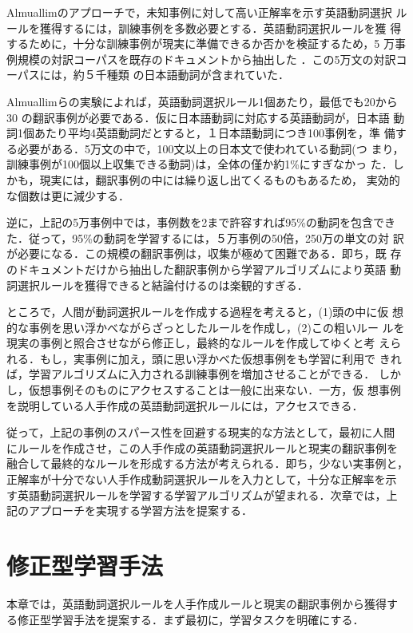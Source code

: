 Almuallimのアプローチで，未知事例に対して高い正解率を示す英語動詞選択
ルールを獲得するには，訓練事例を多数必要とする．英語動詞選択ルールを獲
得するために，十分な訓練事例が現実に準備できるか否かを検証するため，5
万事例規模の対訳コーパスを既存のドキュメントから抽出した
\cite{bunka90,Keene91}．この5万文の対訳コーパスには，約５千種類
の日本語動詞が含まれていた．

Almuallimらの実験によれば，英語動詞選択ルール1個あたり，最低でも20から
30 の翻訳事例が必要である．仮に日本語動詞に対応する英語動詞が，日本語
動詞1個あたり平均4英語動詞だとすると，１日本語動詞につき100事例を，準
備する必要がある．5万文の中で，100文以上の日本文で使われている動詞(つ
まり，訓練事例が100個以上収集できる動詞)は，全体の僅か約1\%にすぎなかっ
た．しかも，現実には，翻訳事例の中には繰り返し出てくるものもあるため，
実効的な個数は更に減少する．

逆に，上記の5万事例中では，事例数を2まで許容すれば95\%の動詞を包含でき
た．従って，95\%の動詞を学習するには，５万事例の50倍，250万の単文の対
訳が必要になる．この規模の翻訳事例は，収集が極めて困難である．即ち，既
存のドキュメントだけから抽出した翻訳事例から学習アルゴリズムにより英語
動詞選択ルールを獲得できると結論付けるのは楽観的すぎる．

ところで，人間が動詞選択ルールを作成する過程を考えると，(1)頭の中に仮
想的な事例を思い浮かべながらざっとしたルールを作成し，(2)この粗いルー
ルを現実の事例と照合させながら修正し，最終的なルールを作成してゆくと考
えられる．もし，実事例に加え，頭に思い浮かべた仮想事例をも学習に利用で
きれば，学習アルゴリズムに入力される訓練事例を増加させることができる．
しかし，仮想事例そのものにアクセスすることは一般に出来ない．一方，仮
想事例を説明している人手作成の英語動詞選択ルールには，アクセスできる．

従って，上記の事例のスパース性を回避する現実的な方法として，最初に人間
にルールを作成させ，この人手作成の英語動詞選択ルールと現実の翻訳事例を
融合して最終的なルールを形成する方法が考えられる．即ち，少ない実事例と，
正解率が十分でない人手作成動詞選択ルールを入力として，十分な正解率を示
す英語動詞選択ルールを学習する学習アルゴリズムが望まれる．次章では，上
記のアプローチを実現する学習方法を提案する．

\section{修正型学習手法}
本章では，英語動詞選択ルールを人手作成ルールと現実の翻訳事例から獲得す
る修正型学習手法を提案する．まず最初に，学習タスクを明確にする．


